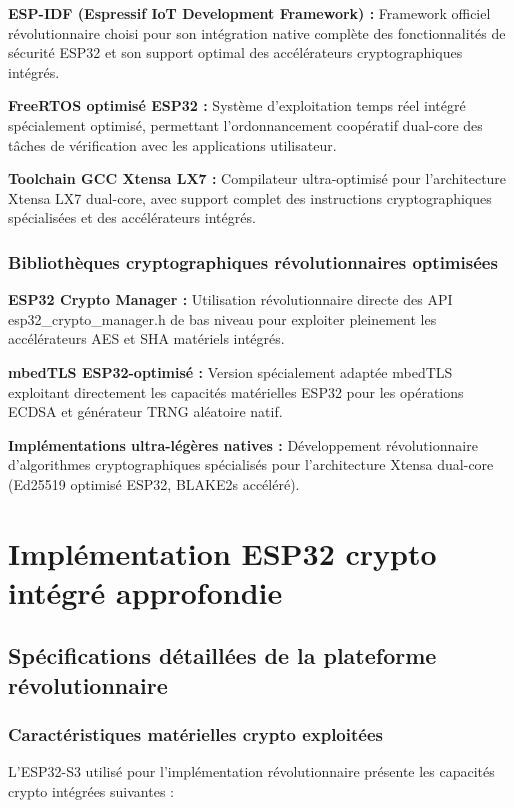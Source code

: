 \textbf{ESP-IDF (Espressif IoT Development Framework) :} Framework officiel révolutionnaire choisi pour son intégration native complète des fonctionnalités de sécurité ESP32 et son support optimal des accélérateurs cryptographiques intégrés.

\textbf{FreeRTOS optimisé ESP32 :} Système d'exploitation temps réel intégré spécialement optimisé, permettant l'ordonnancement coopératif dual-core des tâches de vérification avec les applications utilisateur.

\textbf{Toolchain GCC Xtensa LX7 :} Compilateur ultra-optimisé pour l'architecture Xtensa LX7 dual-core, avec support complet des instructions cryptographiques spécialisées et des accélérateurs intégrés.

\subsubsection{Bibliothèques cryptographiques révolutionnaires optimisées}

\textbf{ESP32 Crypto Manager :} Utilisation révolutionnaire directe des API esp32\_crypto\_manager.h de bas niveau pour exploiter pleinement les accélérateurs AES et SHA matériels intégrés.

\textbf{mbedTLS ESP32-optimisé :} Version spécialement adaptée mbedTLS exploitant directement les capacités matérielles ESP32 pour les opérations ECDSA et générateur TRNG aléatoire natif.

\textbf{Implémentations ultra-légères natives :} Développement révolutionnaire d'algorithmes cryptographiques spécialisés pour l'architecture Xtensa dual-core (Ed25519 optimisé ESP32, BLAKE2s accéléré).

\section{Implémentation ESP32 crypto intégré approfondie}

\subsection{Spécifications détaillées de la plateforme révolutionnaire}

\subsubsection{Caractéristiques matérielles crypto exploitées}

L'ESP32-S3 utilisé pour l'implémentation révolutionnaire présente les capacités crypto intégrées suivantes :

